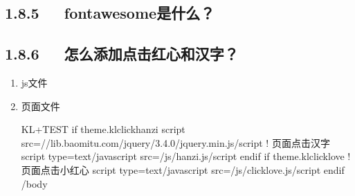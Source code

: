 \documentclass[letterpaper,12pt,english]{sphinxmanual}
\begin{document}
\subsection{1.8.5   fontawesome是什么？}
\label{\detokenize{001software/001install/001._u7f51_u7ad9/hexo:fontawesome}}



\subsection{1.8.6   怎么添加点击红心和汉字？}
\label{\detokenize{001software/001install/001._u7f51_u7ad9/hexo:id21}}\begin{enumerate}
%
\item {} 
js文件

\begin{sphinxVerbatim}[commandchars=\\\{\}]
\end{sphinxVerbatim}

\item {} 
页面文件

\begin{sphinxVerbatim}[commandchars=\\\{\}]
KL+TEST
\PYGZob{}\PYGZpc{}\PYGZhy{} if theme.kl\PYGZus{}click\PYGZus{}hanzi \PYGZpc{}\PYGZcb{}
      \PYGZlt{}script src=\PYGZdq{}//lib.baomitu.com/jquery/3.4.0/jquery.min.js\PYGZdq{}\PYGZgt{}\PYGZlt{}/script\PYGZgt{}
      \PYGZlt{}!\PYGZhy{}\PYGZhy{} 页面点击汉字 \PYGZhy{}\PYGZhy{}\PYGZgt{}
      \PYGZlt{}script type=\PYGZdq{}text/javascript\PYGZdq{} src=\PYGZdq{}/js/hanzi.js\PYGZdq{}\PYGZgt{}\PYGZlt{}/script\PYGZgt{}
\PYGZob{}\PYGZpc{}\PYGZhy{} endif \PYGZpc{}\PYGZcb{}
\PYGZob{}\PYGZpc{}\PYGZhy{} if theme.kl\PYGZus{}click\PYGZus{}love \PYGZpc{}\PYGZcb{}
      \PYGZlt{}!\PYGZhy{}\PYGZhy{} 页面点击小红心 \PYGZhy{}\PYGZhy{}\PYGZgt{}
      \PYGZlt{}script type=\PYGZdq{}text/javascript\PYGZdq{} src=\PYGZdq{}/js/clicklove.js\PYGZdq{}\PYGZgt{}\PYGZlt{}/script\PYGZgt{}
\PYGZob{}\PYGZpc{}\PYGZhy{} endif \PYGZpc{}\PYGZcb{}
\PYGZlt{}/body\PYGZgt{}
\end{sphinxVerbatim}


\end{enumerate}
\end{document}
